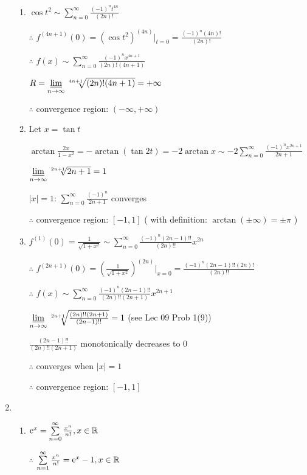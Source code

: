 \begin{enumerate}[1]
\begin{enumerate}[(1)]
        \item
        $\cos t^2\sim \sum\limits_{n=0}^\infty \frac{(-1)^nt^{4n}}{(2n)!}$
        \par $\therefore$ $f^{(4n+1)}(0)=(\cos t^2)^{(4n)}\big|_{t=0}=\frac{(-1)^n(4n)!}{(2n)!}$
        \par $\therefore$ $f(x)\sim \sum\limits_{n=0}^\infty \frac{(-1)^nx^{4n+1}}{(2n)!(4n+1)}$
        \par $R=\varliminf\limits_{n\rightarrow{\infty}} \sqrt[4n+1]{(2n)!(4n+1)}=+\infty$
        \par $\therefore$ convergence region: $(-\infty,+\infty)$
        
        \item
        Let $x=\tan t$
        \par $\arctan \frac{2x}{1-x^2}=-\arctan (\tan 2t)=-2\arctan x\sim -2\sum\limits_{n=0}^\infty \frac{(-1)^nx^{2n+1}}{2n+1}$
        \par $\varliminf\limits_{n\rightarrow{\infty}} \sqrt[2n+1]{2n+1}=1$
        \par $|x|=1$: $\sum\limits_{n=0}^\infty \frac{(-1)^n}{2n+1}$ converges
        \par $\therefore$ convergence region: $[-1,1]$ ( with definition: $\arctan (\pm \infty)=\pm \pi$ )
        
        \item
        $f^{(1)}(0)=\frac{1}{\sqrt{1+x^2}}\sim \sum\limits_{n=0}^\infty\frac{(-1)^n(2n-1)!!}{(2n)!!}x^{2n}$
        \par $\therefore$ $f^{(2n+1)}(0)=(\frac{1}{\sqrt{1+x^2}})^{(2n)}\big|_{x=0} =\frac{(-1)^n(2n-1)!!(2n)!}{(2n)!!}$
        \par $\therefore$ $f(x)\sim \sum\limits_{n=0}^\infty\frac{(-1)^n(2n-1)!!}{(2n)!!(2n+1)}x^{2n+1}$
        \par $\varliminf\limits_{n\rightarrow{\infty}} \sqrt[2n+1]{\frac{(2n)!!(2n+1)}{(2n-1)!!}}=1$  (see Lec 09 Prob 1(9))
        \par $\frac{(2n-1)!!}{(2n)!!(2n+1)}$ monotonically decreases to $0$
        \par $\therefore$ converges when $|x|=1$
        \par $\therefore$ convergence region: $[-1,1]$
        \end{enumerate}
        
    \item
        \begin{enumerate}[(1)]
        \item
        $\mathrm{e}^x=\sum\limits_{n=0}^\infty \frac{x^n}{n!},x\in \mathbb{R}$
        \par $\therefore$ $\sum\limits_{n=1}^\infty \frac{x^n}{n!}=\mathrm{e}^x-1,x\in \mathbb{R}$
        

\end{enumerate}
\end{enumerate}
